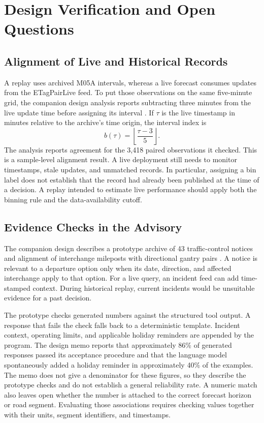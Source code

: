 \section{Design Verification and Open Questions}
\label{sec:verification}

\subsection{Alignment of Live and Historical Records}
A replay uses archived M05A intervals, whereas a live forecast consumes updates from the ETagPairLive feed. To put those observations on the same five-minute grid, the companion design analysis reports subtracting three minutes from the live update time before assigning its interval \cite{dic3designnotes}. If \(\tau\) is the live timestamp in minutes relative to the archive's time origin, the interval index is
\begin{equation}
b(\tau)=\left\lfloor\frac{\tau-3}{5}\right\rfloor .
\end{equation}
The analysis reports agreement for the 3,418 paired observations it checked. This is a sample-level alignment result. A live deployment still needs to monitor timestamps, stale updates, and unmatched records. In particular, assigning a bin label does not establish that the record had already been published at the time of a decision. A replay intended to estimate live performance should apply both the binning rule and the data-availability cutoff.

\subsection{Evidence Checks in the Advisory}
The companion design describes a prototype archive of 43 traffic-control notices and alignment of interchange mileposts with directional gantry pairs \cite{dic3designnotes}. A notice is relevant to a departure option only when its date, direction, and affected interchange apply to that option. For a live query, an incident feed can add time-stamped context. During historical replay, current incidents would be unsuitable evidence for a past decision.

The prototype checks generated numbers against the structured tool output. A response that fails the check falls back to a deterministic template. Incident context, operating limits, and applicable holiday reminders are appended by the program. The design memo reports that approximately 86\% of generated responses passed its acceptance procedure and that the language model spontaneously added a holiday reminder in approximately 40\% of the examples. The memo does not give a denominator for these figures, so they describe the prototype checks and do not establish a general reliability rate. A numeric match also leaves open whether the number is attached to the correct forecast horizon or road segment. Evaluating those associations requires checking values together with their units, segment identifiers, and timestamps.

